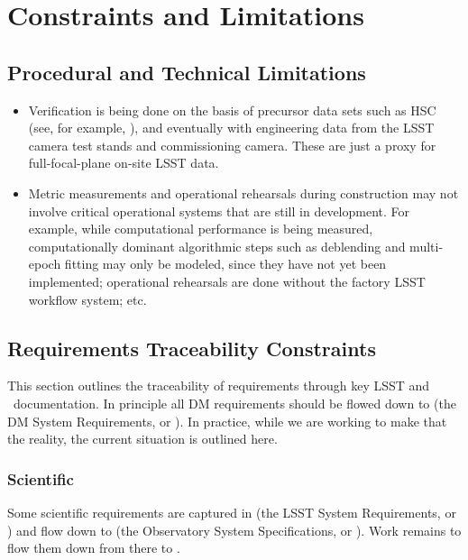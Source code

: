 \section{Constraints and Limitations}

\subsection{Procedural and Technical Limitations}

\begin{itemize}

\item Verification is being done on the basis of precursor data sets such as HSC (see, for example, ), and eventually with engineering data from the LSST camera test stands and commissioning camera. These are just a proxy for full-focal-plane on-site LSST data.

\item Metric measurements and operational rehearsals during construction may not involve critical operational systems that are still in development. For example, while computational performance is being measured, computationally dominant algorithmic steps such as deblending and multi-epoch fitting may only be modeled, since they have not yet been implemented; operational rehearsals are done without the factory LSST workflow system; etc.

\end{itemize}

\subsection{Requirements Traceability Constraints}

This section outlines the traceability of requirements through key LSST and \product\ documentation.
In principle all DM requirements should be flowed down to  (the DM System Requirements, or \DMSR).
In practice, while we are working to make that the reality, the current situation is outlined here.

\subsubsection{Scientific}

Some scientific requirements are captured in  (the LSST System Requirements, or \LSR) and flow down to  (the Observatory System Specifications, or \OSS).
Work remains to flow them down from there to .

